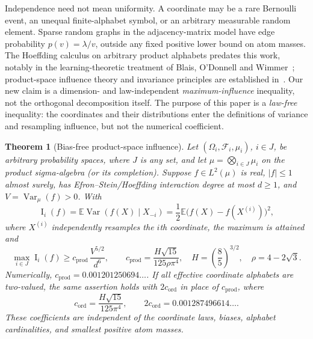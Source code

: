 \documentclass[11pt]{article}
\numberwithin{equation}{section}
\newtheorem{theorem}{Theorem}[section]
\theoremstyle{remark}
\newcommand{\E}{\mathbb E}
\newcommand{\Var}{\operatorname{Var}}
\newcommand{\Inf}{\operatorname{I}}
\newcommand{\cprod}{c_{\mathrm{prod}}}
\newcommand{\cord}{c_{\mathrm{ord}}}
\begin{document}
Independence need not mean uniformity. A coordinate may be a rare Bernoulli event, an unequal finite-alphabet symbol, or an arbitrary measurable random element. Sparse random graphs in the adjacency-matrix model have edge probability $p(v)=\lambda/v$, outside any fixed positive lower bound on atom masses. The Hoeffding calculus on arbitrary product alphabets predates this work, notably in the learning-theoretic treatment of Blais, O'Donnell and Wimmer~\cite{BOW08}; product-space influence theory and invariance principles are established in~\cite{GJN12,MOO10}. Our new claim is a dimension- and law-independent \emph{maximum-influence} inequality, not the orthogonal decomposition itself. The purpose of this paper is a \emph{law-free} inequality: the coordinates and their distributions enter the definitions of variance and resampling influence, but not the numerical coefficient.

\begin{theorem}[Bias-free product-space influence]\label{thm:main}
Let $(\Omega_i,\mathcal F_i,\mu_i)$, $i\in J$, be arbitrary probability spaces, where $J$ is any set, and let $\mu=\bigotimes_{i\in J}\mu_i$ on the product sigma-algebra (or its completion). Suppose $f\in L^2(\mu)$ is real, $|f|\le1$ almost surely, has Efron--Stein/Hoeffding interaction degree at most $d\ge1$, and $V=\Var_\mu(f)>0$. With
\begin{equation}\label{eq:influence}
 \Inf_i(f)=\E\Var(f(X)\mid X_{-i})
 =\frac12\E\bigl(f(X)-f(X^{(i)})\bigr)^2,
\end{equation}
where $X^{(i)}$ independently resamples the $i$th coordinate, the maximum is attained and
\begin{equation}\label{eq:headline}
 \max_{i\in J}\Inf_i(f)\ge \cprod\,\frac{V^{5/2}}{d^6},\qquad
 \cprod=\frac{H\sqrt{15}}{125\rho\pi^4},\quad
 H=\left(\frac85\right)^{3/2},\quad \rho=4-2\sqrt3.
\end{equation}
Numerically, $\cprod=0.001201250694\ldots$. If all effective coordinate alphabets are two-valued, the same assertion holds with $2\cord$ in place of $\cprod$, where
\begin{equation}\label{eq:cord}
 \cord=\frac{H\sqrt{15}}{125\pi^4},\qquad 2\cord=0.001287496614\ldots.
\end{equation}
These coefficients are independent of the coordinate laws, biases, alphabet cardinalities, and smallest positive atom masses.
\end{theorem}
\end{document}
